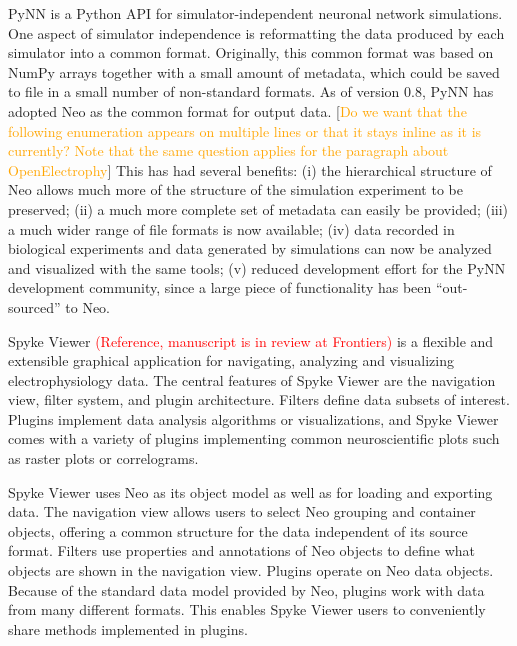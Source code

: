 \documentclass{frontiers}
\newcommand{\missing}[1]{\textcolor{red}{#1}}
\newcommand{\florent}[1]{[\textcolor{Orange}{#1}]}
\begin{document}
PyNN \citep{Davison2009} is a Python API for simulator-independent neuronal network simulations.
One aspect of simulator independence is reformatting the data produced by each simulator into a common format.
Originally, this common format was based on NumPy arrays together with a small amount of metadata, which could be saved to file in a small number of non-standard formats.
As of version 0.8, PyNN has adopted Neo as the common format for output data.
\florent{Do we want that the following enumeration appears on multiple lines or that it stays inline as it is currently? Note that the same question applies for the paragraph about OpenElectrophy}
This has had several benefits:
  (i)   the hierarchical structure of Neo allows much more of the structure of the simulation experiment to be preserved;
  (ii)  a much more complete set of metadata can easily be provided;
  (iii) a much wider range of file formats is now available;
  (iv)  data recorded in biological experiments and data generated by simulations can now be analyzed and visualized with the same tools; 
  (v)   reduced development effort for the PyNN development community, since a large piece of functionality has been ``out-sourced'' to Neo.

Spyke Viewer \missing{(Reference, manuscript is in review at Frontiers)} is a flexible and extensible graphical application for navigating, analyzing and visualizing electrophysiology data. 
The central features of Spyke Viewer are the navigation view, filter system, and plugin architecture.
Filters define data subsets of interest.
Plugins implement data analysis algorithms or visualizations, and Spyke Viewer comes with a variety of plugins implementing common neuroscientific plots such as raster plots or correlograms.

Spyke Viewer uses Neo as its object model as well as for loading and exporting data. 
The navigation view allows users to select Neo grouping and container objects, offering a common structure for the data independent of its source format.
Filters use properties and annotations of Neo objects to define what objects are shown in the navigation view.
Plugins operate on Neo data objects. Because of the standard data model provided by Neo, plugins work with data from many different formats. This enables Spyke Viewer users to conveniently share methods implemented in plugins.
\end{document}
